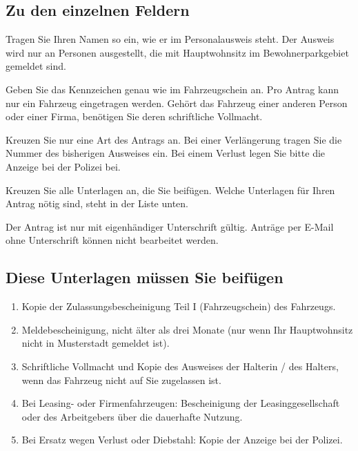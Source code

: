 \documentclass[10pt,a4paper]{article}
\begin{document}
\subsection*{Zu den einzelnen Feldern}
\begin{description}[leftmargin=2.4cm, labelwidth=2.2cm, style=nextline, itemsep=0.3em, font=\bfseries]
  \item[Zu 1] Tragen Sie Ihren Namen so ein, wie er im Personalausweis steht. Der Ausweis wird nur an Personen
        ausgestellt, die mit Hauptwohnsitz im Bewohnerparkgebiet gemeldet sind.
  \item[Zu 2] Geben Sie das Kennzeichen genau wie im Fahrzeugschein an. Pro Antrag kann nur ein Fahrzeug eingetragen
        werden. Gehört das Fahrzeug einer anderen Person oder einer Firma, benötigen Sie deren schriftliche Vollmacht.
  \item[Zu 3] Kreuzen Sie nur eine Art des Antrags an. Bei einer Verlängerung tragen Sie die Nummer des bisherigen Ausweises
        ein. Bei einem Verlust legen Sie bitte die Anzeige bei der Polizei bei.
  \item[Zu 4] Kreuzen Sie alle Unterlagen an, die Sie beifügen. Welche Unterlagen für Ihren Antrag nötig sind,
        steht in der Liste unten.
  \item[Zu 5] Der Antrag ist nur mit eigenhändiger Unterschrift gültig. Anträge per E-Mail ohne Unterschrift
        können nicht bearbeitet werden.
\end{description}

\subsection*{Diese Unterlagen müssen Sie beifügen}
\begin{enumerate}[leftmargin=1.6em, itemsep=0.2em]
  \item Kopie der Zulassungsbescheinigung Teil I (Fahrzeugschein) des Fahrzeugs.
  \item Meldebescheinigung, nicht älter als drei Monate (nur wenn Ihr Hauptwohnsitz nicht in Musterstadt gemeldet ist).
  \item Schriftliche Vollmacht und Kopie des Ausweises der Halterin / des Halters, wenn das Fahrzeug nicht auf Sie zugelassen ist.
  \item Bei Leasing- oder Firmenfahrzeugen: Bescheinigung der Leasinggesellschaft oder des Arbeitgebers über die dauerhafte Nutzung.
  \item Bei Ersatz wegen Verlust oder Diebstahl: Kopie der Anzeige bei der Polizei.
\end{enumerate}
\end{document}
